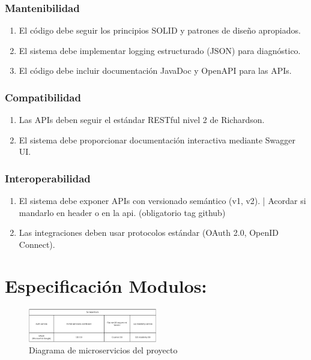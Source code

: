 \documentclass[11pt,a4paper]{article}
\newcommand{\reqnum}[1]{\textbf{\underline{RF-#1}}}
\begin{document}
\subsubsection{Mantenibilidad}
\begin{enumerate}[leftmargin=*,labelwidth=2.5cm,align=left,start=37]
	\item[\reqnum{037}] El código debe seguir los principios SOLID y patrones de diseño apropiados.
	\item[\reqnum{038}] El sistema debe implementar logging estructurado (JSON) para diagnóstico.
	\item[\reqnum{039}] El código debe incluir documentación JavaDoc y OpenAPI para las APIs.
\end{enumerate}

\subsubsection{Compatibilidad}
\begin{enumerate}[leftmargin=*,labelwidth=2.5cm,align=left,start=40]
	\item[\reqnum{040}] Las APIs deben seguir el estándar RESTful nivel 2 de Richardson.
	\item[\reqnum{041}] El sistema debe proporcionar documentación interactiva mediante Swagger UI.
\end{enumerate}

\subsubsection{Interoperabilidad}
\begin{enumerate}[leftmargin=*,labelwidth=2.5cm,align=left,start=44]
	\item[\reqnum{044}] El sistema debe exponer APIs con versionado semántico (v1, v2). | Acordar si mandarlo en header o en la api. (obligatorio tag github)
	\item[\reqnum{045}] Las integraciones deben usar protocolos estándar (OAuth 2.0, OpenID Connect).
\end{enumerate}



\section{Especificación Modulos:}

\begin{figure}[H]
	\centering
	\includegraphics[width=0.5\textwidth]{src/SID_microservices.pdf}
	\caption{Diagrama de microservicios del proyecto}
\end{figure}
\end{document}
